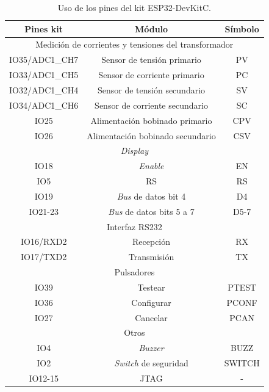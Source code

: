 \begin{table}[htpb]
\centering
\caption[Uso de pines del kit ESP32-DevKitC]{Uso de los pines del kit ESP32-DevKitC.}
\begin{tabular}{c c c}
\hline
\toprule
\textbf{Pines kit} & \textbf{Módulo}                        & \textbf{Símbolo}      \\ \hline
\multicolumn{3}{c}{Medición de corrientes y tensiones del transformador}   \\ \hline
IO35/ADC1\_CH7     & Sensor de tensión primario             & PV           \\
IO33/ADC1\_CH5     & Sensor de corriente primario           & PC           \\
IO32/ADC1\_CH4     & Sensor de tensión secundario           & SV           \\
IO34/ADC1\_CH6     & Sensor de corriente secundario         & SC           \\
IO25               & Alimentación bobinado primario         & CPV          \\
IO26               & Alimentación bobinado secundario       & CSV          \\ \hline
\multicolumn{3}{c}{\textit{Display}}                                       \\ \hline
IO18               & \textit{Enable}                        & EN           \\
IO5                & RS                                     & RS           \\
IO19               & \textit{Bus} de datos bit 4            & D4           \\
IO21-23            & \textit{Bus} de datos bits 5 a 7       & D5-7         \\ \hline
\multicolumn{3}{c}{Interfaz RS232}                                         \\ \hline
IO16/RXD2          & Recepción                              & RX           \\
IO17/TXD2          & Transmisión                            & TX           \\ \hline
\multicolumn{3}{c}{Pulsadores}                                             \\ \hline
IO39               & Testear                                & PTEST        \\
IO36               & Configurar                             & PCONF        \\
IO27               & Cancelar                               & PCAN         \\ \hline
\multicolumn{3}{c}{Otros}                                                  \\ \hline
IO4                & \textit{Buzzer}                        & BUZZ         \\
IO2                & \textit{Switch} de seguridad           & SWITCH       \\
IO12-15            & JTAG                                   & -            \\ 
\bottomrule
\hline
\end{tabular}%
\label{tab:diagramaPines}
\end{table}

